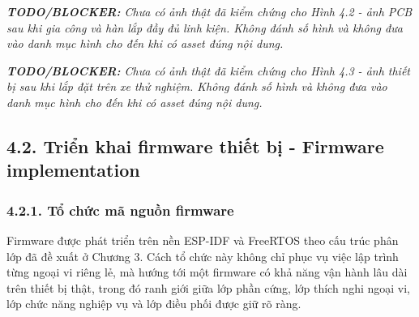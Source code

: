 \documentclass[a4paper]{extarticle}
\begin{document}
\emph{\textbf{TODO/BLOCKER:} Chưa có ảnh thật đã kiểm chứng cho Hình 4.2 - ảnh PCB sau khi gia công và hàn lắp đầy đủ linh kiện. Không đánh số hình và không đưa vào danh mục hình cho đến khi có asset đúng nội dung.}

\emph{\textbf{TODO/BLOCKER:} Chưa có ảnh thật đã kiểm chứng cho Hình 4.3 - ảnh thiết bị sau khi lắp đặt trên xe thử nghiệm. Không đánh số hình và không đưa vào danh mục hình cho đến khi có asset đúng nội dung.}

\subsection{4.2. Triển khai firmware thiết bị - Firmware implementation}\label{triux1ec3n-khai-firmware-thiux1ebft-bux1ecb---firmware-implementation}

\subsubsection{4.2.1. Tổ chức mã nguồn firmware}\label{tux1ed5-chux1ee9c-muxe3-nguux1ed3n-firmware}

Firmware được phát triển trên nền ESP-IDF và FreeRTOS theo cấu trúc phân lớp đã
đề xuất ở Chương 3. Cách tổ chức này không chỉ phục vụ việc lập trình từng ngoại
vi riêng lẻ, mà hướng tới một firmware có khả năng vận hành lâu dài trên thiết bị
thật, trong đó ranh giới giữa lớp phần cứng, lớp thích nghi ngoại vi, lớp chức
năng nghiệp vụ và lớp điều phối được giữ rõ ràng.
\end{document}
